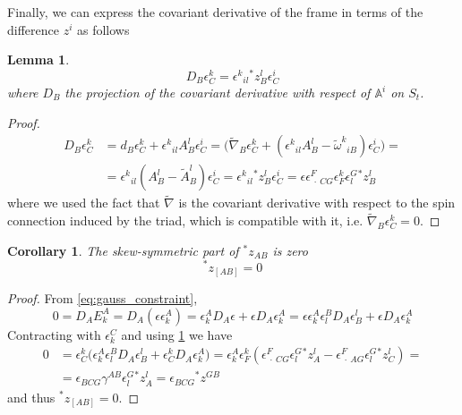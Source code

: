 \documentclass[10pt,a4paper]{amsart}
\newtheorem{corollary}{Corollary}
\newtheorem{lma}{Lemma}
\def\A{\mathbb{A}}
\def\ep{\epsilon}
\def\na{\nabla}
\def\om{\omega}
\def\tp#1{{}^\ast\!#1}
\begin{document}
Finally, we can express the covariant derivative of the frame in terms of the difference $z^i$ as follows
\begin{lma}
    \[D_B \ep^k_C = \ep^k {}_{il} \tp z^l_B \ep^i_C\]
    where $D_B$ the projection of the covariant derivative with respect of $\A^i$ on $S_t$. \label{lma:covder_ep}
\end{lma}
\begin{proof}
\begin{align*}
    D_B \ep^k_C &= d_B\ep^k_C + \ep^k{}_{il}A^l_B \ep^i_C=  \Big(\tilde\na_B \ep^k_C + \left(\ep^k{}_{il}A^l_B - \tilde \om^k{}_{iB}\right)\ep^i_C\Big) = \nonumber \\
    &= \ep^k{}_{il}\left(A^l_B - \tilde A^l_B\right)\ep^i_C = \ep^k{}_{il} \tp z^l_B\ep^i_C = \ep \ep^F_{\> \cdot  \> CG} \ep^k_F \ep^G_l \tp z^l_B 
\end{align*}    
where we used the fact that $\tilde \na$ is the covariant derivative with respect to the spin connection induced by the triad, which is compatible with it, i.e. $\tilde \na_B \ep^k_C = 0$.
\end{proof}

\begin{corollary}
    \label{cor:skew_z}
    The skew-symmetric part of $\tp z_{AB}$ is zero
    \[
        \tp z_{[AB]} = 0
    \]
\end{corollary}

\begin{proof}
From \eqref{eq:gauss_constraint},
\[
    0 = D_A E^A_k =  D_A\left(\ep \ep^A_k\right) = \ep^A_k D_A\ep + \ep D_A\ep^A_k = \ep \ep^A_k  \ep^B_l D_A \ep^l_B + \ep D_A \ep^A_k 
\]
Contracting with $\ep^C_k$ and using  \ref{lma:covder_ep} we have
\begin{align*}
    0 &= \ep^k_C \Big( \ep^A_k \ep^B_l D_A \ep^l_B + \ep^k_C D_A \ep^A_k\Big) = \ep^A_k  \ep^k_F  \left(\ep^F_{\> \cdot  \> CG}\ep^G_l \tp z^l_A - \ep^F_{\> \cdot  \> AG} \ep^G_l \tp z^l_C\right) =  \\ 
&= \ep_{BCG} \gamma^{AB} \ep^G_l\tp z^l_A = \ep_{BCG} \tp z^{GB}
\end{align*}
and thus $\tp z_{[AB]} = 0$.

\end{proof}
\end{document}

